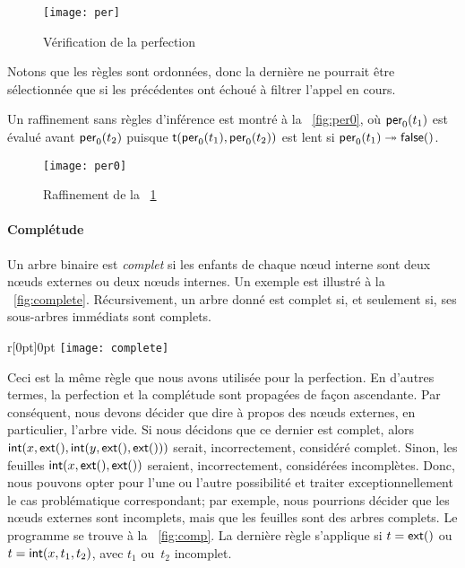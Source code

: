 \bigskip

\begin{figure}[h]
\centering
\texttt{[image: per]}
\caption{Vérification de la perfection}
\label{fig:per}
\end{figure}

\smallskip

\noindent Notons que les règles sont ordonnées, donc la dernière ne
pourrait être sélectionnée que si les précédentes ont échoué à filtrer
l'appel en cours.

Un raffinement sans règles d'inférence est montré à la
\fig~\vref{fig:per0}, où \(\textsf{per}_0(t_1)\) est évalué avant
\(\textsf{per}_0(t_2)\) puisque
\(\textsf{t}(\textsf{per}_0(t_1), \textsf{per}_0(t_2))\) est lent si
\(\textsf{per}_0(t_1) \twoheadrightarrow \textsf{false}()\).

\bigskip

\begin{figure}[h]
\centering
\texttt{[image: per0]}
\caption{Raffinement de la \fig~\ref{fig:per}}
\label{fig:per0}
\end{figure}


\paragraph{Complétude}

Un arbre binaire est \emph{complet} si les enfants de chaque nœud interne sont deux
nœuds externes ou deux nœuds internes. Un exemple est illustré
à la \fig~\ref{fig:complete}. Récursivement, un arbre donné est
complet si, et seulement si, ses sous-arbres immédiats sont complets.
%
\begin{wrapfigure}[7]{r}[0pt]{0pt}
\centering
\texttt{[image: complete]}
\caption{}
\label{fig:complete}
\end{wrapfigure}
Ceci est la même règle que nous avons utilisée pour la perfection. En
d'autres termes, la perfection et la complétude sont propagées de
façon ascendante. Par conséquent, nous devons décider que dire à
propos des nœuds externes, en particulier, l'arbre vide. Si nous
décidons que ce dernier est complet, alors
\(\textsf{int}(x,\textsf{ext}(),\textsf{int}(y,\textsf{ext}(),\textsf{ext}()))\)
serait, incorrectement, considéré complet. Sinon, les
feuilles
\(\textsf{int}(x,\textsf{ext}(),\textsf{ext}())\) seraient, incorrectement,
considérées incomplètes. Donc, nous pouvons opter pour l'une ou
l'autre possibilité et traiter exceptionnellement le cas problématique
correspondant; par exemple, nous pourrions décider que les nœuds
externes sont incomplets, mais que les feuilles sont des arbres
complets. Le programme se trouve à la \fig~\vref{fig:comp}. La
dernière règle s'applique si \(t=\textsf{ext}()\) ou
\(t=\textsf{int}(x,t_1,t_2)\), avec \(t_1\) ou~\(t_2\) incomplet.

